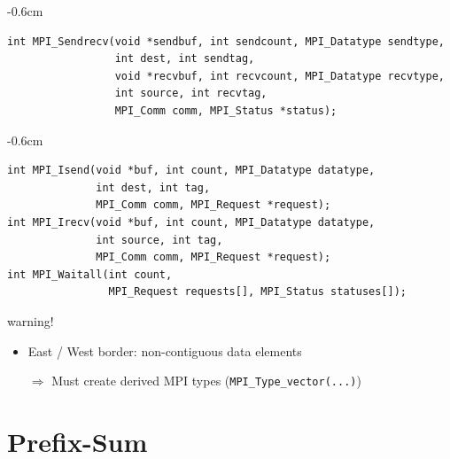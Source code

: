 \documentclass[xcolor={rgb,x11names,svgnames},rgb,x11names,svgnames]{beamer}
\newenvironment{wider}{%
\begin{adjustwidth}{-0.6cm}{}%
  \begin{minipage}{12cm}%
}{%
\end{minipage}%
\end{adjustwidth}%
}
\begin{document}

\begin{frame}[fragile=singleslide]

\begin{wider}
\begin{verbatim}
int MPI_Sendrecv(void *sendbuf, int sendcount, MPI_Datatype sendtype, 
                 int dest, int sendtag, 
                 void *recvbuf, int recvcount, MPI_Datatype recvtype, 
                 int source, int recvtag, 
                 MPI_Comm comm, MPI_Status *status);
\end{verbatim}
\end{wider}

\begin{wider}
\begin{verbatim}
int MPI_Isend(void *buf, int count, MPI_Datatype datatype, 
              int dest, int tag, 
              MPI_Comm comm, MPI_Request *request);
int MPI_Irecv(void *buf, int count, MPI_Datatype datatype,
              int source, int tag, 
              MPI_Comm comm, MPI_Request *request);
int MPI_Waitall(int count, 
                MPI_Request requests[], MPI_Status statuses[]);
\end{verbatim}
\end{wider}

\begin{alertblock}{warning!}
  \begin{itemize}    
  \item East / West border: \alert{non-contiguous} data elements
    \item[$\Rightarrow$] Must create \alert{derived MPI types} (\texttt{MPI_Type_vector(...)})
  \end{itemize}
\end{alertblock}
\end{frame}




\section{Prefix-Sum}
\end{document}
